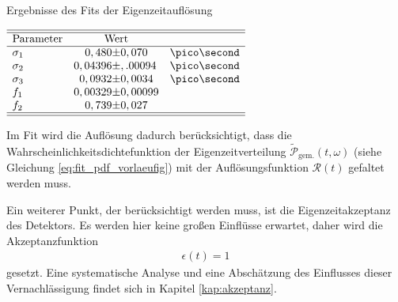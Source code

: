 \begin{table}[hptb]
\centering
\caption{Ergebnisse des Fits der Eigenzeitauflösung}
\label{tab:resolution}
$\begin{array}{l r@{\pm}l l}
\hline 
\hline
\text{Parameter} & \multicolumn{2}{c}{\text{Wert}}&\\
\hline
\sigma_{1} & 0,480 & 0,070 & \ps\\
\sigma_{2} & 0,04396 & ,.00094 & \ps\\
\sigma_{3} & 0,0932 & 0,0034 & \ps\\
f_{1} & 0,00329 & 0,00099\\
f_{2} & 0,739 & 0,027\\ \hline \hline
\end{array}$   
\end{table}

Im Fit wird die Auflösung dadurch berücksichtigt, dass die Wahrscheinlichkeitsdichtefunktion der Eigenzeitverteilung $\widetilde{\mathcal{P}}_{\text{gem.}}(t, \omega)$ (siehe Gleichung \ref{eq:fit_pdf_vorlaeufig}) mit der Auflösungsfunktion $\mathcal{R}(t)$ gefaltet werden muss.

Ein weiterer Punkt, der berücksichtigt werden muss, ist die Eigenzeitakzeptanz des Detektors. Es werden hier keine großen Einflüsse erwartet, daher wird die Akzeptanzfunktion 
\begin{align}
\epsilon(t) = 1
\end{align}
gesetzt. Eine systematische Analyse und eine Abschätzung des Einflusses dieser Vernachlässigung findet sich in Kapitel \ref{kap:akzeptanz}.

